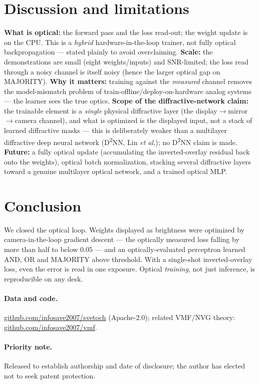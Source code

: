 \documentclass[11pt]{article}
\begin{document}
\section{Discussion and limitations}
\textbf{What is optical:} the forward pass and the loss read-out; the weight update is on the
CPU. This is a \emph{hybrid} hardware-in-the-loop trainer, not fully optical backpropagation ---
stated plainly to avoid overclaiming. \textbf{Scale:} the demonstrations are small (eight
weights/inputs) and SNR-limited; the loss read through a noisy channel is itself noisy (hence the
larger optical gap on MAJORITY). \textbf{Why it matters:} training against the \emph{measured}
channel removes the model-mismatch problem of train-offline/deploy-on-hardware analog systems ---
the learner sees the true optics. \textbf{Scope of the diffractive-network claim:} the trainable
element is a \emph{single} physical diffractive layer (the display$\to$mirror$\to$camera channel),
and what is optimized is the displayed input, not a stack of learned diffractive masks --- this is
deliberately weaker than a multilayer diffractive deep neural network (D\textsuperscript{2}NN,
Lin \emph{et al.}); no D\textsuperscript{2}NN claim is made. \textbf{Future:} a fully optical
update (accumulating the inverted-overlay residual back onto the weights), optical batch
normalization, stacking several diffractive layers toward a genuine multilayer optical network,
and a trained optical MLP.

\section{Conclusion}
We closed the optical loop. Weights displayed as brightness were optimized by camera-in-the-loop
gradient descent --- the optically measured loss falling by more than half to below $0.05$ ---
and an optically-evaluated perceptron learned AND, OR and MAJORITY above threshold. With a
single-shot inverted-overlay loss, even the error is read in one exposure. Optical
\emph{training}, not just inference, is reproducible on any desk.

\paragraph{Data and code.} \href{https://github.com/infosave2007/svetoch}{github.com/infosave2007/svetoch}
(Apache-2.0); related VMF/NVG theory: \href{https://github.com/infosave2007/vmf}{github.com/infosave2007/vmf}.
\paragraph{Priority note.} Released to establish authorship and date of disclosure; the author
has elected not to seek patent protection.
\end{document}

